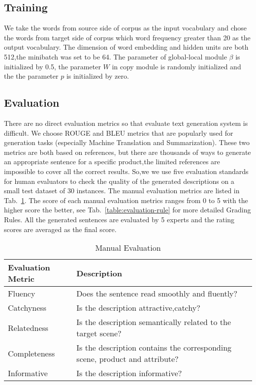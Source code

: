\documentclass[sigconf]{acmart}
\begin{document}
\subsection{Training}
We take the words from source side of corpus as the input vocabulary and chose the words from target side of corpus which word frequency greater than 20 as the output vocabulary. The dimension of word embedding and hidden units are both 512,the minibatch was set to be 64. The parameter of global-local module $\beta$ is initialized by 0.5, the parameter $W$ in copy module is randomly initialized and the the parameter $p$ is initialized by zero.

\subsection{Evaluation}
There are no direct evaluation metrics so that evaluate text generation system is difficult.  We choose ROUGE \cite{lin2004rouge} and BLEU \cite{papineni2002bleu} metrics that are popularly used for generation tasks (especially Machine Translation and Summarization). These two metrics are both based on references, but there are thousands of ways to generate an appropriate sentence for a specific product,the limited references are impossible to cover all the correct results. So,we we use five evaluation standards for human evaluators to check the quality of the generated descriptions on a small test dataset of 30 instances. The manual evaluation metrics are listed in Tab.~\ref{table:evaluation}. The score of each manual evaluation metrics ranges from 0 to 5 with the higher score the better, see Tab.~\ref{table:evaluation-rule} for more detailed Grading Rules. All the generated sentences are evaluated by 5 experts and the rating scores are averaged as the final score.

\begin{table}
\caption{Manual Evaluation }\label{table:evaluation}
\begin{center}
\begin{tabular}{p{2.5cm}p{5cm}}
    \toprule
    Evaluation Metric & Description \\
    \midrule
    Fluency \cite{wang2016chinese} & Does the sentence read smoothly and fluently? \\
    Catchyness \cite{munigala2018persuaide} & Is the description attractive,catchy? \\
    Relatedness \cite{munigala2018persuaide} & Is the description semantically related to the target scene? \\
    Completeness & Is the description contains the corresponding scene, product and attribute? \\
    Informative & Is the description informative?\\
    \bottomrule
\end{tabular}
\end{center}
\end{table} 
\end{document}
